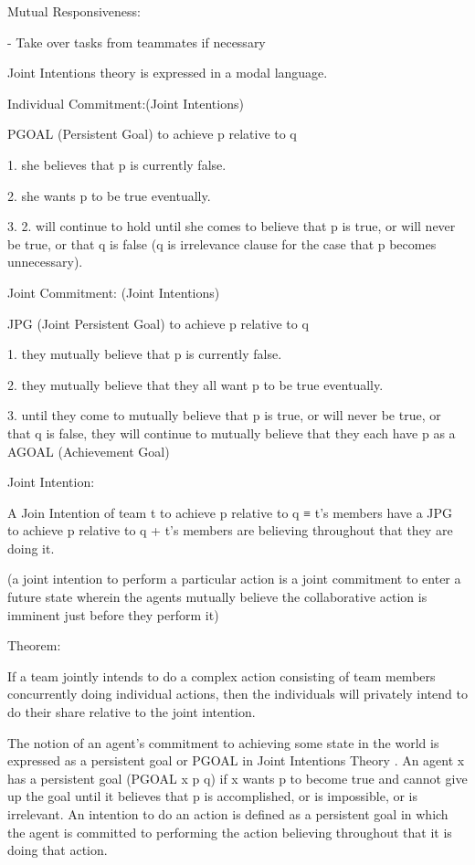\documentclass[11pt]{article}
\begin{document}
Mutual Responsiveness:

- Take over tasks from teammates if necessary

Joint Intentions theory is expressed in a modal language.

Individual Commitment:(Joint Intentions)

PGOAL (Persistent Goal) to achieve p relative to q

1. she believes that p is currently false.

2. she wants p to be true eventually.

3. 2. will continue to hold until she comes to believe that p is true, or will
never be true, or that q is false (q is irrelevance clause for the case that p
becomes unnecessary).

Joint Commitment: (Joint Intentions)

JPG (Joint Persistent Goal) to achieve p relative to q

1. they mutually believe that p is currently false.

2. they mutually believe that they all want p to be true eventually.

3. until they come to mutually believe that p is true, or will never be true, or
that q is false, they will continue to mutually believe that they each have p as
a AGOAL (Achievement Goal)

Joint Intention:

A Join Intention of team t to achieve p relative to q
≡
t’s members have a JPG to achieve p relative to q 
+
t’s members are believing throughout that they are doing it.

(a joint intention to perform a particular action is a joint commitment to enter
a future state wherein the agents mutually believe the collaborative action is
imminent just before they perform it)

Theorem:

If a team jointly intends to do a complex action consisting of team members
concurrently doing individual actions, then the individuals will privately
intend to do their share relative to the joint intention.

The notion of an agent’s commitment to achieving some state in the world is
expressed as a persistent goal or PGOAL in Joint Intentions Theory
\cite{cohen:intention-commitment}. An agent x has a persistent goal (PGOAL x p
q) if x wants p to become true and cannot give up the goal until it believes
that p is accomplished, or is impossible, or is irrelevant. An intention to do
an action is defined as a persistent goal in which the agent is committed to
performing the action believing throughout that it is doing that action.
\end{document}
